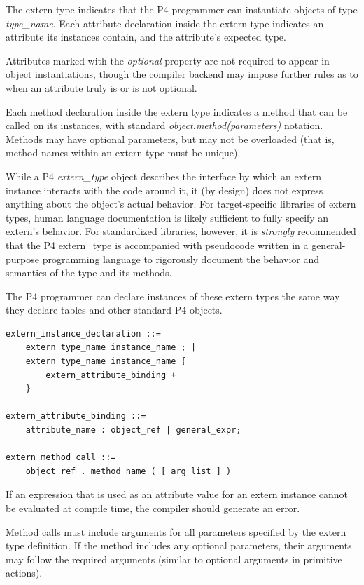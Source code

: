 \documentclass[12pt]{article}
\begin{document}
The extern type indicates that the P4 programmer can instantiate objects of
type \textit{type_name}. Each attribute declaration inside the extern type 
indicates an attribute its instances contain, and the attribute's expected type.

Attributes marked with the \textit{optional} property are not required to
appear in object instantiations, though the compiler backend may impose further
rules as to when an attribute truly is or is not optional.

Each method declaration inside the extern type indicates a method that can be
called on its instances, with standard \textit{object.method(parameters)} 
notation. Methods may have optional parameters, but may not be overloaded (that
is, method names within an extern type must be unique).

While a P4 \textit{extern_type} object describes the interface by which an
extern instance interacts with the code around it, it (by design) does not
express anything about the object's actual behavior. For target-specific
libraries of extern types, human language documentation is likely sufficient 
to fully specify an extern's behavior. For standardized libraries, however,
it is \textit{strongly} recommended that the P4 extern_type is accompanied
with pseudocode written in a general-purpose programming language to rigorously 
document the behavior and semantics of the type and its methods.


The P4 programmer can declare instances of these extern types the same way they
declare tables and other standard P4 objects.

\begin{lstlisting}[style=BNFstyle]
extern_instance_declaration ::= 
    extern type_name instance_name ; |
    extern type_name instance_name { 
        extern_attribute_binding +
    }

extern_attribute_binding ::=
    attribute_name : object_ref | general_expr;

extern_method_call ::= 
    object_ref . method_name ( [ arg_list ] )
\end{lstlisting}

If an expression that is used as an attribute value for an extern
instance cannot be evaluated at compile time, the compiler should
generate an error.

Method calls must include arguments for all parameters specified by the
extern type definition. If the method includes any optional parameters, their
arguments may follow the required arguments (similar to optional arguments
in primitive actions). 
\end{document}

